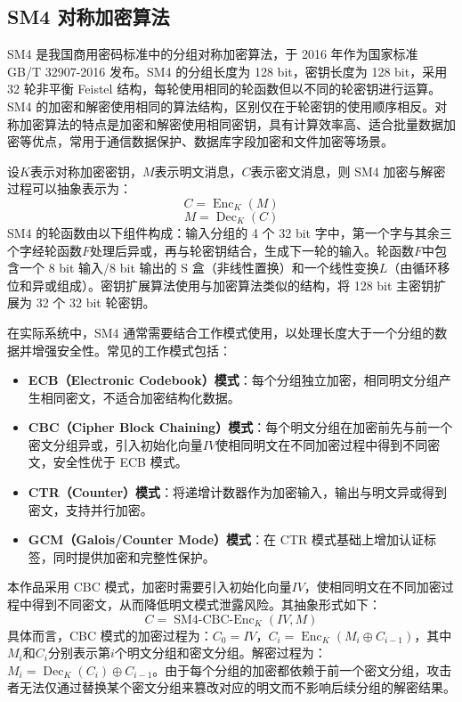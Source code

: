 \subsection{SM4 对称加密算法}

SM4 是我国商用密码标准中的分组对称加密算法，于 2016 年作为国家标准 GB/T 32907-2016 发布\cite{gb_sm4}。SM4 的分组长度为 128 bit，密钥长度为 128 bit，采用 32 轮非平衡 Feistel 结构，每轮使用相同的轮函数但以不同的轮密钥进行运算。SM4 的加密和解密使用相同的算法结构，区别仅在于轮密钥的使用顺序相反。对称加密算法的特点是加密和解密使用相同密钥，具有计算效率高、适合批量数据加密等优点，常用于通信数据保护、数据库字段加密和文件加密等场景。

设$K$表示对称加密密钥，$M$表示明文消息，$C$表示密文消息，则 SM4 加密与解密过程可以抽象表示为：
\begin{equation}
C = \operatorname{Enc}_{K}(M)
\end{equation}
\begin{equation}
M = \operatorname{Dec}_{K}(C)
\end{equation}
SM4 的轮函数由以下组件构成：输入分组的 4 个 32 bit 字中，第一个字与其余三个字经轮函数$F$处理后异或，再与轮密钥结合，生成下一轮的输入。轮函数$F$中包含一个 8 bit 输入/8 bit 输出的 S 盒（非线性置换）和一个线性变换$L$（由循环移位和异或组成）。密钥扩展算法使用与加密算法类似的结构，将 128 bit 主密钥扩展为 32 个 32 bit 轮密钥。

在实际系统中，SM4 通常需要结合工作模式使用，以处理长度大于一个分组的数据并增强安全性。常见的工作模式包括：

\begin{itemize}[leftmargin=2em]
\item \textbf{ECB（Electronic Codebook）模式}：每个分组独立加密，相同明文分组产生相同密文，不适合加密结构化数据。
\item \textbf{CBC（Cipher Block Chaining）模式}：每个明文分组在加密前先与前一个密文分组异或，引入初始化向量$IV$使相同明文在不同加密过程中得到不同密文，安全性优于 ECB 模式。
\item \textbf{CTR（Counter）模式}：将递增计数器作为加密输入，输出与明文异或得到密文，支持并行加密。
\item \textbf{GCM（Galois/Counter Mode）模式}：在 CTR 模式基础上增加认证标签，同时提供加密和完整性保护。
\end{itemize}

本作品采用 CBC 模式，加密时需要引入初始化向量$IV$，使相同明文在不同加密过程中得到不同密文，从而降低明文模式泄露风险。其抽象形式如下：
\begin{equation}
C = \operatorname{SM4\text{-}CBC\text{-}Enc}_{K}(IV, M)
\end{equation}
具体而言，CBC 模式的加密过程为：$C_0 = IV$，$C_i = \operatorname{Enc}_K(M_i \oplus C_{i-1})$，其中$M_i$和$C_i$分别表示第$i$个明文分组和密文分组。解密过程为：$M_i = \operatorname{Dec}_K(C_i) \oplus C_{i-1}$。由于每个分组的加密都依赖于前一个密文分组，攻击者无法仅通过替换某个密文分组来篡改对应的明文而不影响后续分组的解密结果。

